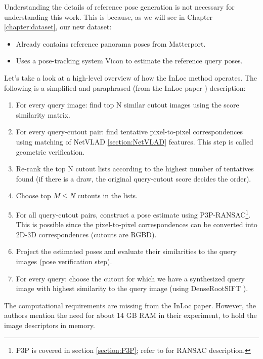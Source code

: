 \documentclass[twoside]{ctuthesis}
\theoremstyle{plain}
\theoremstyle{definition}
\theoremstyle{note}
\newcommand{\code}[1]{{\ttfamily #1%
}}
\begin{document}
Understanding the details of reference pose generation is not necessary for understanding this work. This is because, as we will see in Chapter \ref{chapter:dataset}, our new dataset:

\begin{itemize}
	\item Already contains reference panorama poses from Matterport.
	\item Uses a pose-tracking system Vicon to estimate the reference query poses.
\end{itemize}

Let's take a look at a high-level overview of how the InLoc method operates. The following is a simplified and paraphrased (from the InLoc paper \cite{taira2018inloc}) description:

\begin{enumerate}
	\item For every query image: find top N similar cutout images using the \code{score} similarity matrix.
	\item For every query-cutout pair: find tentative pixel-to-pixel correspondences using matching of NetVLAD \ref{section:NetVLAD} features. This step is called geometric verification.
	\item Re-rank the top N cutout lists according to the highest number of tentatives found (if there is a draw, the original query-cutout score decides the order).
	\item Choose top $M \le N$ cutouts in the lists.
	\item For all query-cutout pairs, construct a pose estimate using P3P-RANSAC\footnote{P3P is covered in section \ref{section:P3P}; refer to \cite{RANSAC} for RANSAC description.}. This is possible since the pixel-to-pixel correspondences can be converted into 2D-3D correspondences (cutouts are RGBD).
	\item Project the estimated poses and evaluate their similarities to the query images (pose verification step).
	\item For every query: choose the cutout for which we have a synthesized query image with highest similarity to the query image (using DenseRootSIFT \cite{RootSIFT} \cite{DenseSIFT}).
\end{enumerate}

The computational requirements are missing from the InLoc paper. However, the authors mention the need for about 14 GB RAM in their experiment, to hold the image descriptors in memory.
\end{document}
